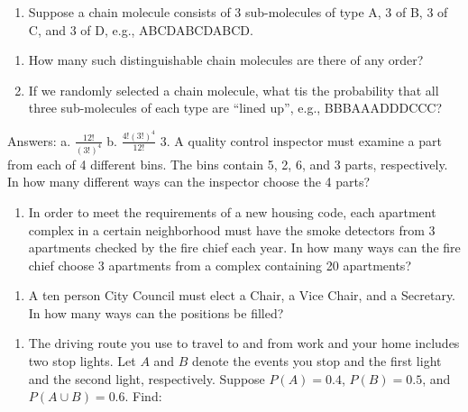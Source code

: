 \documentclass[
]{book}
\providecommand{\tightlist}{%
  \setlength{\itemsep}{0pt}\setlength{\parskip}{0pt}}
\begin{document}
\begin{enumerate}
\def\labelenumi{\arabic{enumi}.}
\setcounter{enumi}{1}
\tightlist
\item
  Suppose a chain molecule consists of 3 sub-molecules of type A, 3 of B, 3 of C, and 3 of D, e.g., ABCDABCDABCD.\\
\end{enumerate}

\begin{enumerate}
\def\labelenumi{\alph{enumi}.}
\tightlist
\item
  How many such distinguishable chain molecules are there of any order?
\item
  If we randomly selected a chain molecule, what tis the probability that all three sub-molecules of each type are ``lined up'', e.g., BBBAAADDDCCC?
\end{enumerate}

Answers:
a. \(\frac{12!}{(3!)^4}\)
b. \(\frac{4!(3!)^4}{12!}\)
3. A quality control inspector must examine a part from each of 4 different bins. The bins contain 5, 2, 6, and 3 parts, respectively. In how many different ways can the inspector choose the 4 parts?

\begin{enumerate}
\def\labelenumi{\arabic{enumi}.}
\setcounter{enumi}{3}
\tightlist
\item
  In order to meet the requirements of a new housing code, each apartment complex in a certain neighborhood must have the smoke detectors from 3 apartments checked by the fire chief each year. In how many ways can the fire chief choose 3 apartments from a complex containing 20 apartments?
\end{enumerate}

\begin{enumerate}
\def\labelenumi{\arabic{enumi}.}
\setcounter{enumi}{4}
\tightlist
\item
  A ten person City Council must elect a Chair, a Vice Chair, and a Secretary. In how many ways can the positions be filled?
\end{enumerate}

\begin{enumerate}
\def\labelenumi{\arabic{enumi}.}
\setcounter{enumi}{5}
\tightlist
\item
  The driving route you use to travel to and from work and your home includes two stop lights. Let \(A\) and \(B\) denote the events you stop and the first light and the second light, respectively. Suppose \(P(A) = 0.4\), \(P(B) = 0.5\), and \(P(A\cup B) = 0.6\). Find:
\end{enumerate}
\end{document}
